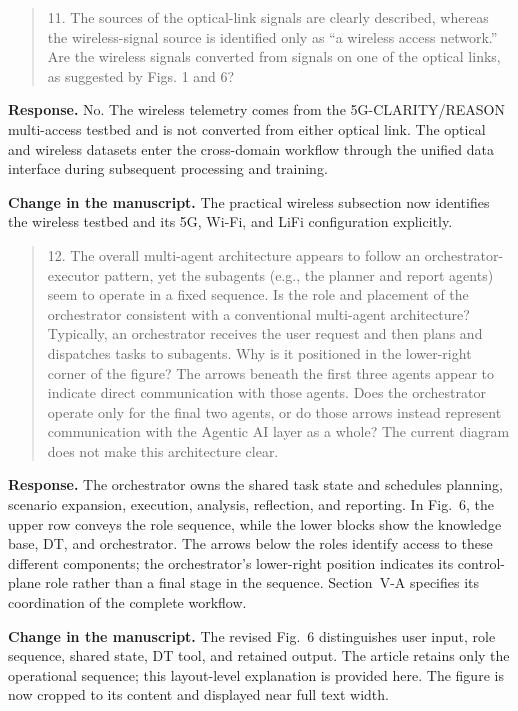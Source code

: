 \documentclass[11pt]{article}
\newenvironment{reviewercomment}{\begin{quote}\color{reviewblue}}{\end{quote}}
\newenvironment{authorresponse}{\color{responsegreen}\textbf{Response.} }{\par\color{black}}
\newcommand{\change}[1]{\par\textbf{Change in the manuscript.} #1\par}
\begin{document}
\begin{reviewercomment}
11. The sources of the optical-link signals are clearly described, whereas the wireless-signal source is identified only as ``a wireless access network.'' Are the wireless signals converted from signals on one of the optical links, as suggested by Figs. 1 and 6?
\end{reviewercomment}
\begin{authorresponse}
No. The wireless telemetry comes from the 5G-CLARITY/REASON multi-access testbed and is not converted from either optical link. The optical and wireless datasets enter the cross-domain workflow through the unified data interface during subsequent processing and training.
\end{authorresponse}
\change{The practical wireless subsection now identifies the wireless testbed and its 5G, Wi-Fi, and LiFi configuration explicitly.}

\begin{reviewercomment}
12. The overall multi-agent architecture appears to follow an orchestrator-executor pattern, yet the subagents (e.g., the planner and report agents) seem to operate in a fixed sequence. Is the role and placement of the orchestrator consistent with a conventional multi-agent architecture? Typically, an orchestrator receives the user request and then plans and dispatches tasks to subagents. Why is it positioned in the lower-right corner of the figure? The arrows beneath the first three agents appear to indicate direct communication with those agents. Does the orchestrator operate only for the final two agents, or do those arrows instead represent communication with the Agentic AI layer as a whole? The current diagram does not make this architecture clear.
\end{reviewercomment}
\begin{authorresponse}
The orchestrator owns the shared task state and schedules planning, scenario expansion, execution, analysis, reflection, and reporting. In Fig.~6, the upper row conveys the role sequence, while the lower blocks show the knowledge base, DT, and orchestrator. The arrows below the roles identify access to these different components; the orchestrator's lower-right position indicates its control-plane role rather than a final stage in the sequence. Section~V-A specifies its coordination of the complete workflow.
\end{authorresponse}
\change{The revised Fig.~6 distinguishes user input, role sequence, shared state, DT tool, and retained output. The article retains only the operational sequence; this layout-level explanation is provided here. The figure is now cropped to its content and displayed near full text width.}
\end{document}
